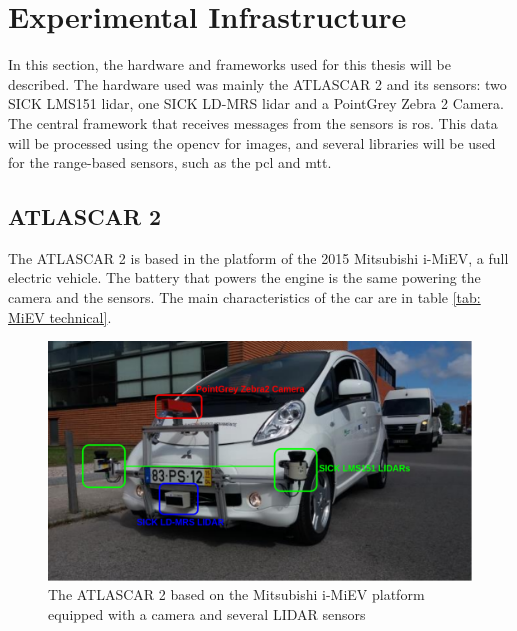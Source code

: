 \chapter{Experimental Infrastructure}

In this section, the hardware and frameworks used for this thesis will be described. The hardware used was mainly the ATLASCAR 2 and its sensors: two SICK LMS151 \gls{lidar}, one SICK LD-MRS \gls{lidar} and a PointGrey Zebra 2 Camera. The central framework that receives messages from the sensors is \gls{ros}. This data will be processed using the \gls{opencv} for images, and several libraries will be used for the range-based sensors, such as the \gls{pcl} and \gls{mtt}. 

\section{ATLASCAR 2}

The ATLASCAR 2 is based in the platform of the 2015 Mitsubishi i-MiEV, a full electric vehicle. The battery that powers the engine is the same powering the camera and the sensors. The main characteristics of the car are in table \ref{tab: MiEV technical}. 

\begin{figure}[htp]
	
	\centering
	\includegraphics[width=.9\textwidth]{capexp/imgs/atlascar2.png}\hfill
	
	\caption{The ATLASCAR 2 based on the Mitsubishi i-MiEV platform equipped with a camera and several LIDAR sensors}
	\label{fig:imiev}
	
\end{figure}

